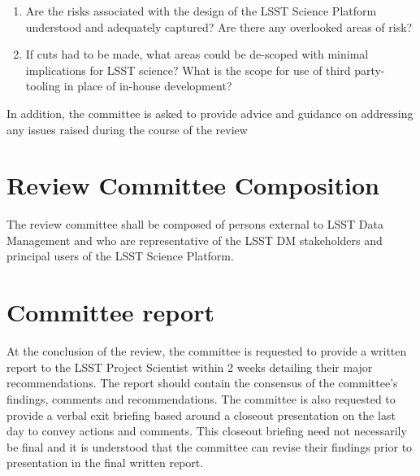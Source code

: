 \documentclass[DM,lsstdraft,STS,toc]{lsstdoc}
\begin{document}
\begin{enumerate}
%
\item Are the risks associated with the design of the LSST Science Platform understood and adequately captured? Are there any overlooked areas of risk? 
%
\item If cuts had to be made, what areas could be de-scoped with minimal implications for LSST science? What is the scope for use of third party-tooling in place of in-house development?  \color{red}{(Alternative if DM-10 is approved) In light of the recent implementation of de-scope item DM10: Eliminate the Portal Aspect of the Science Platform, are the the remaining two aspects of the LSP sufficient to 
ensure LSST science harvest covering the four key science themes? What, if any, third party-tooling could be substituted for the Portal aspect to ensure that the LSP can deliver the science promise of LSST?}
\end{enumerate}

In addition, the committee is asked to provide advice and guidance on addressing any issues raised during the course of the review

\section{Review Committee Composition} 
The review committee shall be composed of persons external to LSST Data Management 
and who are representative of the LSST DM stakeholders and principal users of the LSST Science Platform.


\section{Committee report}
At the conclusion of the review, the committee is requested to provide a written report  to the LSST Project Scientist within 2 weeks  detailing 
their major recommendations.  The report should contain the consensus of the committee's findings, comments and recommendations. The committee is also requested to 
provide a verbal exit briefing based around a closeout presentation on the last day to convey actions and comments. This closeout briefing need not 
necessarily be final and it is understood that the committee can revise their findings prior to presentation in the final written report. 
\end{document}
